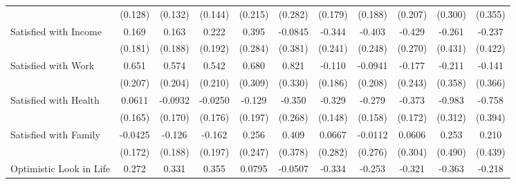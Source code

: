 {\begin{tabular}{l*{10}{c}}
            &     (0.128)         &     (0.132)         &     (0.144)         &     (0.215)         &     (0.282)         &     (0.179)         &     (0.188)         &     (0.207)         &     (0.300)         &     (0.355)         \\
\addlinespace
Satisfied with Income&       0.169         &       0.163         &       0.222         &       0.395         &     -0.0845         &      -0.344         &      -0.403         &      -0.429         &      -0.261         &      -0.237         \\
            &     (0.181)         &     (0.188)         &     (0.192)         &     (0.284)         &     (0.381)         &     (0.241)         &     (0.248)         &     (0.270)         &     (0.431)         &     (0.422)         \\
\addlinespace
Satisfied with Work&       0.651\sym{**} &       0.574\sym{**} &       0.542\sym{**} &       0.680\sym{*}  &       0.821\sym{*}  &      -0.110         &     -0.0941         &      -0.177         &      -0.211         &      -0.141         \\
            &     (0.207)         &     (0.204)         &     (0.210)         &     (0.309)         &     (0.330)         &     (0.186)         &     (0.208)         &     (0.243)         &     (0.358)         &     (0.366)         \\
\addlinespace
Satisfied with Health&      0.0611         &     -0.0932         &     -0.0250         &      -0.129         &      -0.350         &      -0.329\sym{*}  &      -0.279         &      -0.373\sym{*}  &      -0.983\sym{**} &      -0.758         \\
            &     (0.165)         &     (0.170)         &     (0.176)         &     (0.197)         &     (0.268)         &     (0.148)         &     (0.158)         &     (0.172)         &     (0.312)         &     (0.394)         \\
\addlinespace
Satisfied with Family&     -0.0425         &      -0.126         &      -0.162         &       0.256         &       0.409         &      0.0667         &     -0.0112         &      0.0606         &       0.253         &       0.210         \\
            &     (0.172)         &     (0.188)         &     (0.197)         &     (0.247)         &     (0.378)         &     (0.282)         &     (0.276)         &     (0.304)         &     (0.490)         &     (0.439)         \\
\addlinespace
Optimistic Look in Life&       0.272\sym{**} &       0.331\sym{**} &       0.355\sym{**} &      0.0795         &     -0.0507         &      -0.334\sym{**} &      -0.253\sym{*}  &      -0.321\sym{**} &      -0.363\sym{*}  &      -0.218         \\

\end{tabular}}

